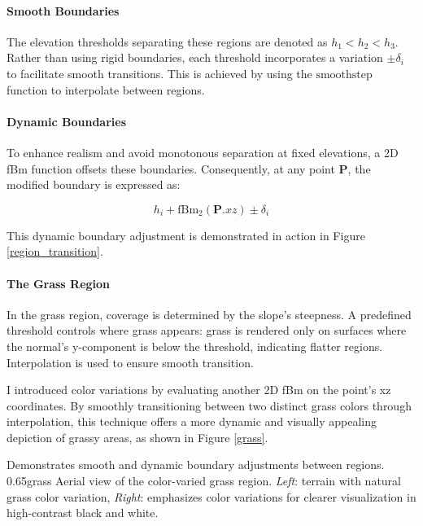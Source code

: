 \paragraph{Smooth Boundaries}
The elevation thresholds separating these regions are denoted as $h_{1} < h_{2} < h_{3}$. Rather than using rigid boundaries, each threshold incorporates a variation $\pm \delta_i$ to facilitate smooth transitions. This is achieved by using the $\text{smoothstep}$ function to interpolate between regions.

\paragraph{Dynamic Boundaries}
To enhance realism and avoid monotonous separation at fixed elevations, a 2D fBm function offsets these boundaries. Consequently, at any point $\mathbf{P}$, the modified boundary is expressed as:

\begin{equation}
    h_{i} + \text{fBm}_{2}(\mathbf{P}.xz) \pm \delta_i
\end{equation}

This dynamic boundary adjustment is demonstrated in action in Figure \ref{region_transition}.



\paragraph{The Grass Region}
In the grass region, coverage is determined by the slope's steepness. A predefined threshold controls where grass appears: grass is rendered only on surfaces where the normal's y-component is below the threshold, indicating flatter regions. Interpolation is used to ensure smooth transition. 

I introduced color variations by evaluating another 2D fBm on the point's xz coordinates. By smoothly transitioning between two distinct grass colors through interpolation, this technique offers a more dynamic and visually appealing depiction of grassy areas, as shown in Figure \ref{grass}.

{Demonstrates smooth and dynamic boundary adjustments between regions.}
{0.65}{grass}
{Aerial view of the color-varied grass region. \textit{Left}: terrain with natural grass color variation, \textit{Right}: emphasizes color variations for clearer visualization in high-contrast black and white.}

